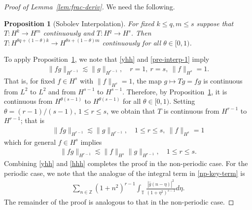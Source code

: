 \documentclass[12pt,reqno]{amsart}
\numberwithin{equation}{section}  %
\numberwithin{figure}{section}
\newcommand{\zz}{\mathbb{Z}}
\newcommand{\ci}{\mathbb{T}}
\newcommand{\wh}{\widehat}
\newtheorem{proposition}[theorem]{Proposition}
\begin{document}
\begin{proof}[Proof of Lemma~\ref{lem:frac-deriv}]
We need the following.
%
%
%
%
%                
%
%
%
%
\begin{proposition}[Sobolev Interpolation]
  For fixed $k \le q, m \le s$ suppose that \\ $T: H^{k} \to H^{m}$ continuously
and $T: H^{q} \to H^{s}$. Then\\ $T: H^{\theta q + (1 - \theta)k} \to H^{\theta
s + (1 - \theta) m}$ continuously for all $\theta \in [0,1)$.
\label{prop:sob-interp}
\end{proposition}
%
To apply Proposition~\ref{prop:sob-interp}, we note that \eqref{yhh}
and \eqref{pre-interp-1} imply
%
%
\begin{equation*}
\begin{split}
  \| f g \|_{H^{r-1}} \lesssim \| g \|_{H^{r-1}}, \quad
  r=1, \  r =s, \ \| f \|_{H^{s}} =1.
\end{split}
\end{equation*}
%
%
That is, for fixed $f \in H^{s}$ with $\| f \|_{H^{s}} =1$, the map $g \mapsto
Tg = fg$ is continuous from $L^{2}$ to $L^{2}$ and from $H^{s-1}$ to
$H^{s-1}$. Therefore, by Proposition~\ref{prop:sob-interp}, it is continuous from
$H^{\theta (s-1) }$ to $H^{\theta (s-1)}$ for all $\theta \in
[0, 1)$. Setting $\theta = (r-1)/(s-1)$, $ 1 \le r \le s$, we obtain that $T$ is
continuous from $H^{r-1}$ to $H^{r-1}$; that is
%
%
\begin{equation*}
\begin{split}
  \| f g \|_{H^{r-1}} \lesssim \| g \|_{H^{r-1}}, \quad 1 \le r \le s, \
  \| f \|_{H^{s}} =1
\end{split}
\end{equation*}
which for general $f \in H^{s}$ implies 
%
\begin{equation}
  \label{hhh}
\begin{split}
  \| f g \|_{H^{r-1}} \lesssim \|f \|_{H^{s}}
  \| g \|_{H^{r-1}}, \quad 1 \le r \le s. 
\end{split}
\end{equation}
%
Combining \eqref{yhh} and \eqref{hhh} completes the proof in the non-periodic
case. For the periodic case, we note that the analogue of the integral term in \eqref{np-key-term} is
%
%
%
\begin{equation*}
\begin{split}
  \sum_{n \in \zz}   (1 + n^{2})^{r-1}\int_{\ci} \frac{| \wh{g}(n - \eta)
  |^{2}}{(1 + \eta^{2})^{s-1}} d \eta. 
\end{split}
\end{equation*}
%
%
The remainder of the proof is analogous to that in the non-periodic case.
\end{proof}
\end{document}

